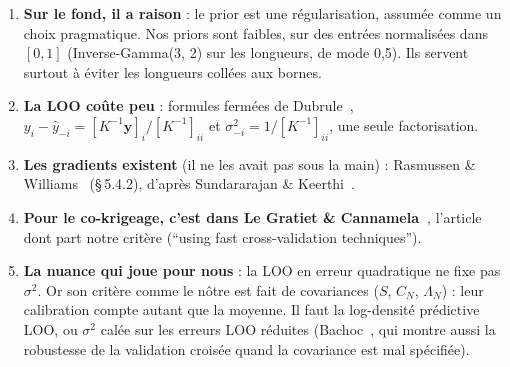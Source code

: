\documentclass[11pt,a4paper]{article}
\begin{document}
\begin{enumerate}
  \item \textbf{Sur le fond, il a raison} : le prior est une régularisation, assumée comme un choix pragmatique.
        Nos priors sont faibles, sur des entrées normalisées dans $[0,1]$ (Inverse-Gamma(3, 2) sur les
        longueurs, de mode 0,5). Ils servent surtout à éviter les longueurs collées aux bornes.
  \item \textbf{La LOO coûte peu} : formules fermées de Dubrule~\cite{Dub83},
        $y_i-\hat y_{-i}=[K^{-1}\bm y]_i/[K^{-1}]_{ii}$ et $\sigma^2_{-i}=1/[K^{-1}]_{ii}$, une seule
        factorisation.
  \item \textbf{Les gradients existent} (il ne les avait pas sous la main) : Rasmussen \& Williams~\cite{RW06}
        (§\,5.4.2), d'après Sundararajan \& Keerthi~\cite{SK01}.
  \item \textbf{Pour le co-krigeage, c'est dans Le Gratiet \& Cannamela~\cite{LGC15}}, l'article dont part notre
        critère (\enquote{using fast cross-validation techniques}).
  \item \textbf{La nuance qui joue pour nous} : la LOO en erreur quadratique ne fixe pas $\sigma^2$. Or son
        critère comme le nôtre est fait de covariances ($S$, $C_N$, $\Lambda_N$) : leur calibration compte
        autant que la moyenne. Il faut la log-densité prédictive LOO, ou $\sigma^2$ calée sur les erreurs LOO
        réduites (Bachoc~\cite{Bac13}, qui montre aussi la robustesse de la validation croisée quand la
        covariance est mal spécifiée).
\end{enumerate}
\end{document}
